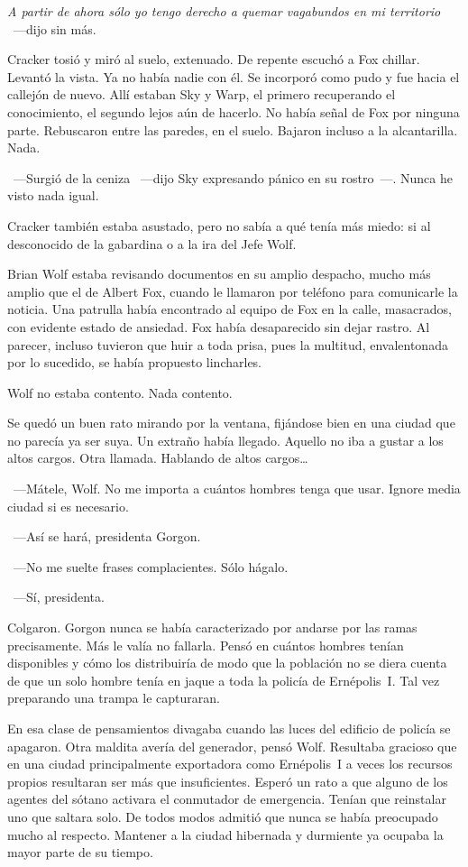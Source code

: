 \emph{A partir de ahora sólo yo tengo derecho a quemar vagabundos en mi territorio} ~---dijo sin más.

Cracker tosió y miró al suelo, extenuado. De repente escuchó a Fox chillar. Levantó la vista. Ya no había nadie con él. Se incorporó como pudo y fue hacia el callejón de nuevo. Allí estaban Sky y Warp, el primero recuperando el conocimiento, el segundo lejos aún de hacerlo. No había señal de Fox por ninguna parte. Rebuscaron entre las paredes, en el suelo. Bajaron incluso a la alcantarilla. Nada.

~---Surgió de la ceniza ~---dijo Sky expresando pánico en su rostro~---. Nunca he visto nada igual.

Cracker también estaba asustado, pero no sabía a qué tenía más miedo: si al desconocido de la gabardina o a la ira del Jefe Wolf.

Brian Wolf estaba revisando documentos en su amplio despacho, mucho más amplio que el de Albert Fox, cuando le llamaron por teléfono para comunicarle la noticia. Una patrulla había encontrado al equipo de Fox en la calle, masacrados, con evidente estado de ansiedad. Fox había desaparecido sin dejar rastro. Al parecer, incluso tuvieron que huir a toda prisa, pues la multitud, envalentonada por lo sucedido, se había propuesto lincharles.

Wolf no estaba contento. Nada contento.

Se quedó un buen rato mirando por la ventana, fijándose bien en una ciudad que no parecía ya ser suya. Un extraño había llegado. Aquello no iba a gustar a los altos cargos. Otra llamada. Hablando de altos cargos\dots

~---Mátele, Wolf. No me importa a cuántos hombres tenga que usar. Ignore media ciudad si es necesario.

~---Así se hará, presidenta Gorgon.

~---No me suelte frases complacientes. Sólo hágalo.

~---Sí, presidenta.

Colgaron. Gorgon nunca se había caracterizado por andarse por las ramas precisamente. Más le valía no fallarla. Pensó en cuántos hombres tenían disponibles y cómo los distribuiría de modo que la población no se diera cuenta de que un solo hombre tenía en jaque a toda la policía de Ernépolis~I. Tal vez preparando una trampa le capturaran.

En esa clase de pensamientos divagaba cuando las luces del edificio de policía se apagaron. Otra maldita avería del generador, pensó Wolf. Resultaba gracioso que en una ciudad principalmente exportadora como Ernépolis~I a veces los recursos propios resultaran ser más que insuficientes. Esperó un rato a que alguno de los agentes del sótano activara el conmutador de emergencia. Tenían que reinstalar uno que saltara solo. De todos modos admitió que nunca se había preocupado mucho al respecto. Mantener a la ciudad hibernada y durmiente ya ocupaba la mayor parte de su tiempo.


